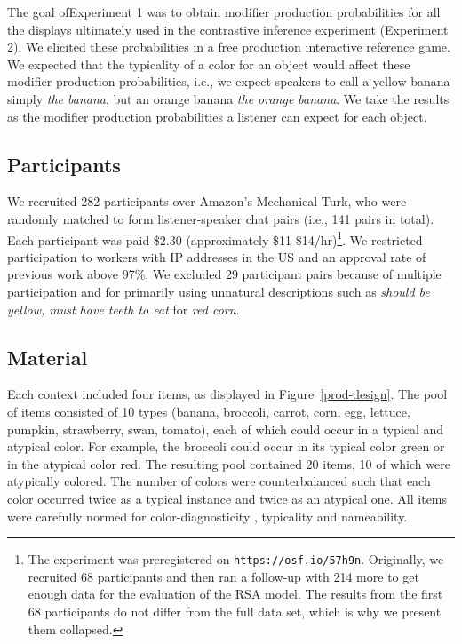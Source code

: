 \documentclass[10pt,letterpaper]{article}
\begin{document}
The goal ofExperiment 1 was to obtain modifier production probabilities for all the displays ultimately used in the contrastive inference experiment (Experiment 2). We elicited these probabilities in a free production interactive reference game. We expected that the typicality of a color for an object would affect these modifier production probabilities, i.e., we expect speakers to call a yellow banana simply \textit{the banana}, but an orange banana \textit{the orange banana}. We take the results as the modifier production probabilities a listener can expect for each object.

\subsection{Participants}
We recruited 282 participants over Amazon's Mechanical Turk, who were randomly matched to form listener-speaker chat pairs (i.e., 141 pairs in total). 
Each participant was paid \$2.30 (approximately \$11-\$14/hr)\footnote{The experiment was preregistered on \texttt{https://osf.io/57h9n}. Originally, we recruited 68 participants and then ran a follow-up with 214 more to get enough data for the evaluation of the RSA model. The results from the first 68 participants do not differ from the full data set, which is why we present them collapsed.}. We restricted participation to workers with IP addresses in the US and an approval rate of previous work above 97\%.
We excluded 29 participant pairs because of multiple participation and for primarily using unnatural descriptions such as \textit{should be yellow, must have teeth to eat} for \textit{red corn}.



\subsection{Material} \label{Material}
Each context included four items, as displayed in Figure~\ref{prod-design}. The pool of items consisted of 10 types (banana, broccoli, carrot, corn, egg, lettuce, pumpkin, strawberry, swan, tomato), each of which could occur in a typical and atypical color. For example, the broccoli could occur in its typical color green or in the atypical color red. The resulting pool contained 20 items, 10 of which were atypically colored. The number of colors were counterbalanced such that each color occurred twice as a typical instance and twice as an atypical one. All items were carefully normed for color-diagnosticity \cite{Tanaka:1999}, typicality and nameability.
\end{document}
